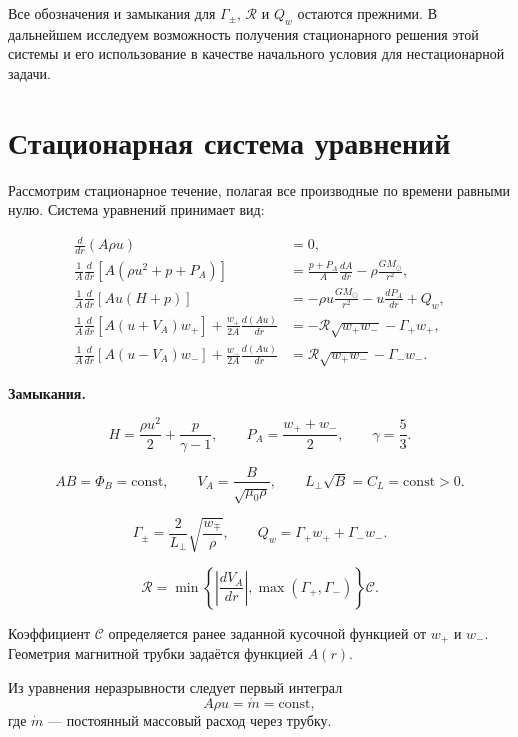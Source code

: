 \documentclass[12pt,a4paper]{article}
\newcommand{\PA}{P_A}
\newcommand{\Rref}{\mathcal R}
\begin{document}
Все обозначения и замыкания для $\Gamma_\pm$,
$\Rref$ и $Q_w$ остаются прежними.
В дальнейшем исследуем возможность получения
стационарного решения этой системы и его использование
в качестве начального условия для нестационарной задачи.


\section{Стационарная система уравнений}
\label{sec:stationary}

Рассмотрим стационарное течение, полагая все производные
по времени равными нулю. Система уравнений принимает вид:

\begingroup
\small
\begin{align}
\frac{d}{dr}(A\rho u)
&=0,
\label{eq:st_mass}\\[5pt]
\frac{1}{A}\frac{d}{dr}
\left[A(\rho u^2+p+\PA)\right]
&=\frac{p+\PA}{A}\frac{dA}{dr}-\rho\frac{GM_\odot}{r^2},
\label{eq:st_momentum}\\[5pt]
\frac{1}{A}\frac{d}{dr}\left[Au(H+p)\right]
&=-\rho u\frac{GM_\odot}{r^2}
-u\frac{d\PA}{dr}+Q_w,
\label{eq:st_energy}\\[5pt]
\frac{1}{A}\frac{d}{dr}\left[A(u+V_A)w_+\right]
+\frac{w_+}{2A}\frac{d(Au)}{dr}
&=-\Rref\sqrt{w_+w_-}-\Gamma_+w_+,
\label{eq:st_wplus}\\[5pt]
\frac{1}{A}\frac{d}{dr}\left[A(u-V_A)w_-\right]
+\frac{w_-}{2A}\frac{d(Au)}{dr}
&=\Rref\sqrt{w_+w_-}-\Gamma_-w_-.
\label{eq:st_wminus}
\end{align}
\endgroup

\noindent\textbf{Замыкания.}

\[
H=\frac{\rho u^2}{2}+\frac{p}{\gamma-1},
\qquad
\PA=\frac{w_++w_-}{2},
\qquad \gamma=\frac53.
\]

\[
AB=\Phi_B=\mathrm{const},
\qquad
V_A=\frac{B}{\sqrt{\mu_0\rho}},
\qquad
L_\perp\sqrt B=C_L=\mathrm{const}>0.
\]

\[
\Gamma_\pm=\frac{2}{L_\perp}\sqrt{\frac{w_\mp}{\rho}},
\qquad
Q_w=\Gamma_+w_++\Gamma_-w_-.
\]

\[
\Rref=
\min\left\{
\left|\frac{dV_A}{dr}\right|,
\max(\Gamma_+,\Gamma_-)
\right\}\mathcal C.
\]

Коэффициент $\mathcal C$ определяется ранее заданной
кусочной функцией от $w_+$ и $w_-$.
Геометрия магнитной трубки задаётся функцией $A(r)$.

Из уравнения неразрывности следует первый интеграл
\[
A\rho u=\dot m=\mathrm{const},
\]
где $\dot m$ --- постоянный массовый расход через трубку.
\end{document}
